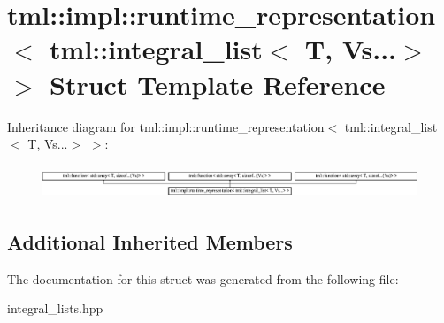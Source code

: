 \hypertarget{structtml_1_1impl_1_1runtime__representation_3_01tml_1_1integral__list_3_01T_00_01Vs_8_8_8_4_01_4}{\section{tml\+:\+:impl\+:\+:runtime\+\_\+representation$<$ tml\+:\+:integral\+\_\+list$<$ T, Vs...$>$ $>$ Struct Template Reference}
\label{structtml_1_1impl_1_1runtime__representation_3_01tml_1_1integral__list_3_01T_00_01Vs_8_8_8_4_01_4}
}
Inheritance diagram for tml\+:\+:impl\+:\+:runtime\+\_\+representation$<$ tml\+:\+:integral\+\_\+list$<$ T, Vs...$>$ $>$\+:\begin{figure}[H]
\begin{center}
\leavevmode
\includegraphics[height=1.011743cm]{structtml_1_1impl_1_1runtime__representation_3_01tml_1_1integral__list_3_01T_00_01Vs_8_8_8_4_01_4}
\end{center}
\end{figure}
\subsection*{Additional Inherited Members}


The documentation for this struct was generated from the following file\+:\begin{DoxyCompactItemize}
\item 
integral\+\_\+lists.\+hpp\end{DoxyCompactItemize}
